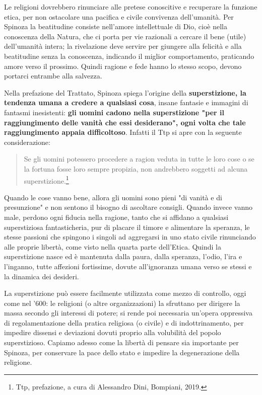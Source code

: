 Le religioni dovrebbero rinunciare alle pretese conoscitive e recuperare la funzione etica, per non ostacolare una pacifica e civile convivenza dell'umanità. Per Spinoza la beatitudine consiste nell'amore intellettuale di Dio, cioè nella conoscenza della Natura, che ci porta per vie razionali a cercare il bene (utile) dell'umanità intera; la rivelazione deve servire per giungere alla felicità e alla beatitudine senza la conoscenza, indicando il miglior comportamento, praticando amore verso il prossimo. Quindi ragione e fede hanno lo stesso scopo, devono portarci entrambe alla salvezza.

Nella prefazione del Trattato, Spinoza spiega l'origine della \textbf{superstizione, la tendenza umana a credere a qualsiasi cosa}, insane fantasie e immagini di fantasmi inesistenti: \textbf{gli uomini cadono nella superstizione "per il raggiungimento delle vanità che essi
desiderano"}\textbf{, ogni volta che tale raggiungimento appaia difficoltoso}. Infatti il Ttp si
apre con la seguente considerazione: 

\begin{quotation}
	\small Se gli uomini potessero procedere a ragion veduta in tutte le
	loro cose o se la fortuna fosse loro sempre propizia, non andrebbero soggetti ad alcuna
	superstizione.\footnote{Ttp, prefazione, a cura di Alessandro Dini, Bompiani, 2019.}
\end{quotation}

Quando le cose vanno bene, allora gli uomini sono pieni "di vanità e di
presunzione" e non sentono il bisogno di ascoltare consigli. Quando invece vanno
male, perdono ogni fiducia nella ragione, tanto che si affidano a qualsiasi
superstiziosa fantasticheria, pur di placare il timore e alimentare la speranza, le stesse passioni che spingono i singoli ad aggregarsi in uno stato civile rinunciando alle proprie libertà, come visto nella quarta parte dell'Etica. Quindi la superstizione nasce ed è mantenuta dalla paura, dalla speranza, l'odio, l'ira e l'inganno, tutte affezioni fortissime, dovute all'ignoranza umana verso se stessi e la dinamica dei desideri.

La superstizione può essere facilmente utilizzata come mezzo di controllo, oggi come nel '600: le religioni (o altre organizzazioni) la sfruttano per dirigere la massa secondo gli interessi di potere; si rende poi necessaria un'opera oppressiva di regolamentazione della pratica religiosa (o civile) e di indottrinamento, per impedire dissensi e deviazioni dovuti proprio alla volubilità del popolo superstizioso. Capiamo adesso come la libertà di pensare sia importante per Spinoza, per conservare la pace dello stato e impedire la degenerazione della religione.

